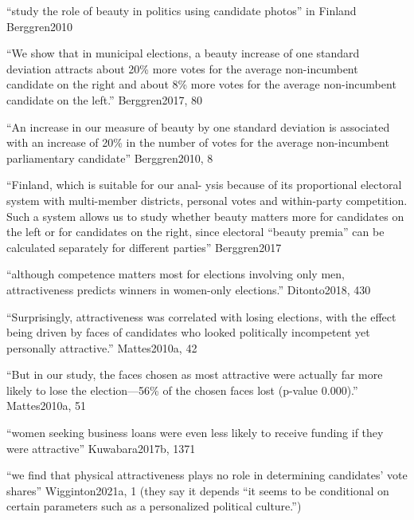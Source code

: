 



		``study the role of beauty in politics using candidate photos'' in Finland Berggren2010

		``We show that in municipal elections, a beauty increase of one standard deviation attracts about 20\% more votes for the average non-incumbent candidate on the right and about 8\% more votes for the average non-incumbent candidate on the left.'' Berggren2017, 80

		``An increase in our measure of beauty by one standard deviation is associated with an increase of 20\% in the number of votes for the average non-incumbent parliamentary candidate'' Berggren2010, 8

		``Finland, which is suitable for our anal- ysis because of its proportional electoral system with multi-member districts, personal votes and within-party competition. Such a system allows us to study whether beauty matters more for candidates on the left or for candidates on the right, since electoral “beauty premia” can be calculated separately for different parties'' Berggren2017


		``although competence matters most for elections involving only men, attractiveness predicts winners in women-only elections.'' Ditonto2018, 430

		``Surprisingly, attractiveness was correlated with losing elections, with the effect being driven by faces of candidates who looked politically incompetent yet personally attractive.'' Mattes2010a, 42

		``But in our study, the faces chosen as most attractive were actually far more likely to lose the election—56\% of the chosen faces lost (p-value 0.000).'' Mattes2010a, 51

		``women seeking business loans were even less likely to receive funding if they were attractive'' Kuwabara2017b, 1371

		``we find that physical attractiveness plays no role in determining candidates’ vote shares'' Wigginton2021a, 1 (they say it depends ``it seems to be conditional on certain parameters such as a personalized political culture.'')